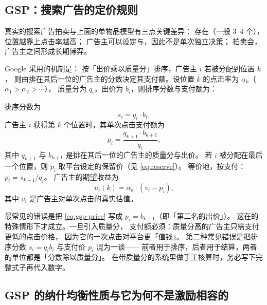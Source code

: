 \subsection{GSP：搜索广告的定价规则}

真实的搜索广告拍卖与上面的单物品模型有三点关键差异：
存在（一般 3--4 个），位置越靠上点击率越高；
广告主可以设定与，因此不是单次独立决策；
拍卖会，广告主之间形成长期博弈。

Google 采用的机制是：
按「出价乘以质量分」排序，广告主 $i$ 若被分配到位置 $k$，
则由排在其后一位的广告主的分数决定其支付额。设位置 $k$ 的点击率为 $\alpha_k$（$\alpha_1 > \alpha_2 > \cdots$），
质量分为 $q_i$，出价为 $b_i$，则排序分数与支付额为：

\begin{formulacard}
排序分数为
\begin{equation}
s_i = q_i \cdot b_i ,
\label{eq:gsp-rank}
\end{equation}
广告主 $i$ 获得第 $k$ 个位置时，其单次点击支付额为
\begin{equation}
p_i = \frac{q_{k+1} \cdot b_{k+1}}{q_i} ,
\label{eq:gsp-price}
\end{equation}
其中 $q_{k+1}$ 与 $b_{k+1}$ 是排在其后一位的广告主的质量分与出价。
若 $i$ 被分配在最后一个位置，则 $p_i$ 取平台设定的保留价（见 \cref{eq:reserve}）。
等价地，按支付：$p_i = s_{k+1} / q_i$。
广告主的期望收益为
\begin{equation}
u_i(k) = \alpha_k \cdot (v_i - p_i) ,
\label{eq:gsp-utility}
\end{equation}
其中 $v_i$ 是广告主对单次点击的真实估值。
\end{formulacard}

\begin{pitfall}
最常见的错误是把 \cref{eq:gsp-price} 写成 $p_i = b_{k+1}$（即「第二名的出价」）。
这在的特殊情形下才成立。一旦引入质量分，
支付额必须：质量分高的广告主只需支付更低的点击价格，
因为它的一次点击对平台更「值钱」。
第二种常见错误是把排序分数 $s_i = q_i b_i$ 与支付价 $p_i$ 混为一谈——
前者用于排序，后者用于结算，两者的单位都是「分数除以质量分」。
在带质量分的系统里做手工核算时，务必写下完整式子再代入数字。
\end{pitfall}

\subsection{GSP 的纳什均衡性质与它为何不是激励相容的}

